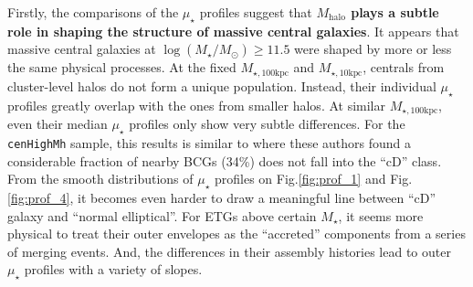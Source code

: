 \documentclass{emulateapj}
\def\rbcg{\texttt{cenHighMh}}
\def\mstar{{$M_{\star}$}}
\def\mhalo{{$M_{\mathrm{halo}}$}}
\def\logms{{$\log (M_{\star}/M_{\odot})$}}
\def\minn{{$M_{\star,10\mathrm{kpc}}$}}
\def\mtot{{$M_{\star,100\mathrm{kpc}}$}}
\def\mden{{$\mu_{\star}$}}
\newcommand{\update}[1]{\textcolor{Bittersweet}{#1}}
\begin{document}
\begin{CJK*}{UTF8}{gbsn}
    Firstly, the comparisons of the \mden{} profiles suggest that \textbf{\mhalo{} plays
    a subtle role in shaping the structure of massive central galaxies}.  
    It appears that massive central galaxies at \logms{}$\geq 11.5$ were shaped by more 
    or less the same physical processes.  
    At the fixed \mtot{} and \minn{}, centrals from cluster-level halos do not form a 
    unique population. 
    Instead, their individual \mden{} profiles greatly overlap with the ones from smaller 
    halos.
    At similar \mtot{}, even their median \mden{} profiles only show very subtle 
    differences. 
    For the \rbcg{} sample, this results is similar to \citep{Zhao2015} where these 
    authors found a considerable fraction of nearby BCGs (34\%) does not fall into 
    the ``cD'' class.
    \update{
    From the smooth distributions of \mden{} profiles on Fig.\ref{fig:prof_1} 
    and Fig.\ref{fig:prof_4}, it becomes even harder to draw a meaningful line  
    between ``cD'' galaxy and ``normal elliptical''. 
    For ETGs above certain \mstar{}, it seems more physical to treat their outer 
    envelopes as the ``accreted'' components from a series of merging events. 
    And, the differences in their assembly histories lead to outer \mden{} profiles 
    with a variety of slopes. 
    }


\end{CJK*}
\end{document}
